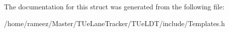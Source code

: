 The documentation for this struct was generated from the following file\-:\begin{DoxyCompactItemize}
\item 
/home/rameez/\-Master/\-T\-Ue\-Lane\-Tracker/\-T\-Ue\-L\-D\-T/include/Templates.\-h\end{DoxyCompactItemize}
